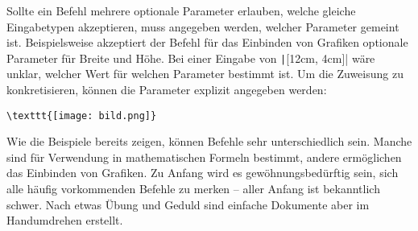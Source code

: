 Sollte ein Befehl mehrere optionale Parameter erlauben, welche gleiche Eingabetypen akzeptieren, muss angegeben werden, welcher Parameter gemeint ist. Beispielsweise akzeptiert der Befehl für das Einbinden von Grafiken optionale Parameter für Breite und Höhe. Bei einer Eingabe von \texttt|[12cm, 4cm]| wäre unklar, welcher Wert für welchen Parameter bestimmt ist. Um die Zuweisung zu konkretisieren, können die Parameter explizit angegeben werden:
\begin{verbatim}
\texttt{[image: bild.png]}
\end{verbatim}

Wie die Beispiele bereits zeigen, können Befehle sehr unterschiedlich sein. Manche sind für Verwendung in mathematischen Formeln bestimmt, andere ermöglichen das Einbinden von Grafiken. Zu Anfang wird es gewöhnungsbedürftig sein, sich alle häufig vorkommenden Befehle zu merken -- aller Anfang ist bekanntlich schwer. Nach etwas Übung und Geduld sind einfache Dokumente aber im Handumdrehen erstellt. 

